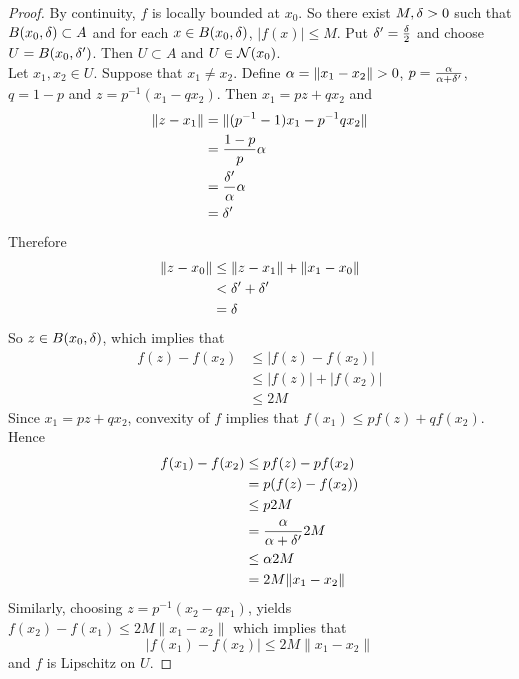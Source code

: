 \documentclass{book}
\begin{document}
	\begin{proof}
	By continuity, $f$ is locally bounded at $x_0$. So there exist $M, \delta >0$ such that $B(x_0, \delta) \subset A$ and for each $x \in B(x_0, \delta)$, $|f(x)| \leq M$. Put $\delta' = \frac{\delta}{2}$ and choose $U = B(x_0, \delta')$. Then $U \subset A$ and $U \in \mathcal{N}(x_0)$. \\
	Let $x_1, x_2 \in U$. Suppose that $x_1 \neq x_2$. Define $\alpha = \|x_1 - x_2\| >0$, $p = \frac{\alpha}{\alpha + \delta'}$, $q = 1-p$ and $z = p^{-1}(x_1 - qx_2)$. Then $x_1 = pz + qx_2$ and 
	\begin{align*}
	\|z - x_1\| 
	&= \|(p^{-1} - 1)x_1 - p^{-1}qx_2\| \\
	&= \frac{1-p}{p} \alpha \\
	&= \frac{\delta'}{\alpha} \alpha \\
	&= \delta ' 
	\end{align*}
	Therefore 
	\begin{align*}
	\|z - x_0\| 
	& \leq \|z - x_1\| + \|x_1 - x_0\| \\
	& <  \delta '  + \delta '  \\
	&= \delta
\end{align*}	  
	So $z \in B(x_0, \delta)$, which implies that 
	\begin{align*}
	f(z) - f(x_2) 
	& \leq |f(z) - f(x_2)|\\ 
	&\leq |f(z)| + |f(x_2)| \\
	&\leq 2M
\end{align*}		
	Since $x_1 = pz + qx_2$, convexity of $f$ implies that $f(x_1) \leq pf(z) + qf(x_2)$. Hence 
	\begin{align*}
	f(x_1) - f(x_2) 
	& \leq pf(z) -pf(x_2) \\
	&= p(f(z) - f(x_2)) \\
	& \leq p 2M \\
	&= \frac{\alpha}{\alpha + \delta'} 2M \\
	& \leq \alpha 2M \\
	&= 2M \|x_1 - x_2 \|
	\end{align*}
	Similarly, choosing $z = p^{-1}(x_2 - qx_1)$, yields $f(x_2) - f(x_1) \leq 2M \|x_1 - x_2 \|$ which implies that $$|f(x_1) - f(x_2)| \leq 2M \|x_1 - x_2 \|$$ and $f$ is Lipschitz on $U$. 
 	\end{proof}


	
	
	
	
	
	
	
	
	
	
\end{document}
